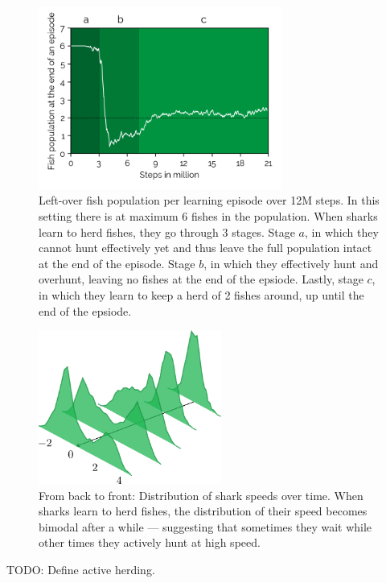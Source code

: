\documentclass[letterpaper]{article}
\begin{document}
\begin{figure}[t]
\begin{center}
\includegraphics[width=8cm]{figures/fish_pop_chart3.png}
    \caption{Left-over fish population per learning episode over 12M steps. In this setting there is at maximum 6 fishes in the population. When sharks learn to herd fishes, they go through 3 stages. Stage $a$, in which they cannot hunt effectively yet and thus leave the full population intact at the end of the episode. Stage $b$, in which they effectively hunt and overhunt, leaving no fishes at the end of the epsiode. Lastly, stage $c$, in which they learn to keep a herd of 2 fishes around, up until the end of the epsiode.}
\label{fig:fish_pop}
\end{center}
\end{figure}

\begin{figure}[t]
\begin{center}
\includegraphics[width=6cm]{figures/shark_speeds.png}
\caption{From back to front: Distribution of shark speeds over time. When sharks learn to herd fishes, the distribution of their speed becomes bimodal after a while --- suggesting that sometimes they wait while other times they actively hunt at high speed.}
\label{fig:shark_speeds}
\end{center}
\end{figure}

TODO: Define active herding.
\end{document}
